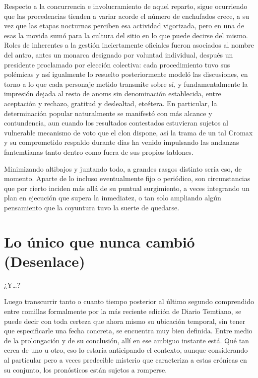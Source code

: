 \documentclass[
]{book}
\begin{document}
Respecto a la concurrencia e involucramiento de aquel reparto, sigue ocurriendo que las procedencias tienden a variar acorde el número de enchufados crece, a su vez que las etapas nocturnas perciben esa actividad vigorizada, pero en una de esas la movida sumó para la cultura del sitio en lo que puede decirse del mismo. Roles de inherentes a la gestión inciertamente oficiales fueron asociados al nombre del antro, antes un monarca designado por voluntad individual, después un presidente proclamado por elección colectiva: cada procedimiento tuvo sus polémicas y así igualmente lo resuelto posteriormente modeló las discusiones, en torno a lo que cada personaje metido transmite sobre sí, y fundamentalmente la impresión dejada al resto de anoms sin denominación establecida, entre aceptación y rechazo, gratitud y deslealtad, etcétera. En particular, la determinación popular naturalmente se manifestó con más alcance y contundencia, aun cuando los resultados contestados estuvieran sujetos al vulnerable mecanismo de voto que el clon dispone, así la trama de un tal Cromax y su comprometido respaldo durante días ha venido impulsando las andanzas fantemtianas tanto dentro como fuera de sus propios tablones.

Minimizando altibajos y juntando todo, a grandes rasgos distinto sería eso, de momento. Aparte de lo incluso eventualmente fijo o periódico, son circunstancias que por cierto inciden más allá de su puntual surgimiento, a veces integrando un plan en ejecución que supera la inmediatez, o tan solo ampliando algún pensamiento que la coyuntura tuvo la suerte de quedarse.

\hypertarget{lo-uxfanico-que-nunca-cambiuxf3-desenlace}{%
\chapter{Lo único que nunca cambió (Desenlace)}\label{lo-uxfanico-que-nunca-cambiuxf3-desenlace}}

¿Y\ldots?

Luego transcurrir tanto o cuanto tiempo posterior al último segundo comprendido entre comillas formalmente por la más reciente edición de Diario Temtiano, se puede decir con toda certeza que ahora mismo su ubicación temporal, sin tener que especificarle una fecha concreta, se encuentra muy bien definida. Entre medio de la prolongación y de su conclusión, allí en ese ambiguo instante está. Qué tan cerca de uno u otro, eso lo estaría anticipando el contexto, aunque considerando al particular pero a veces predecible misterio que caracteriza a estas crónicas en su conjunto, los pronósticos están sujetos a romperse.
\end{document}

